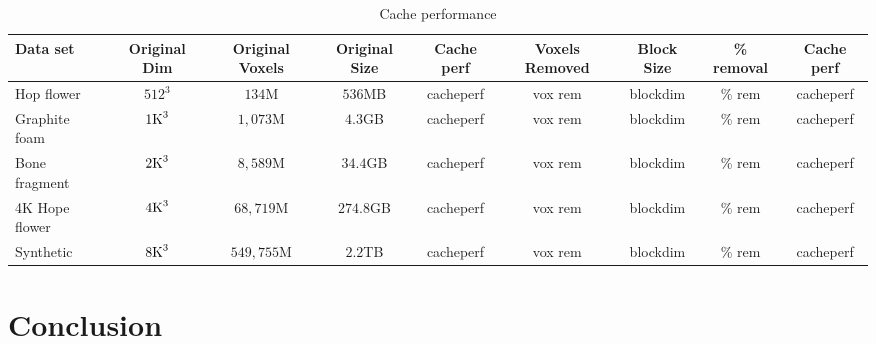 \documentclass[journal]{vgtc}                %
\begin{document}
\begin{table}[h]
	\caption{Cache performance}\label{table:cachePerformance}
	\scriptsize
	
	\begin{center}
		
		\begin{tabular}{lcccc|cccc}
			\textbf{Data set} & \textbf{Original Dim}& \textbf{Original Voxels} & \textbf{Original Size}& \textbf{Cache perf} & 
				\textbf{Voxels Removed} & \textbf{Block Size} & \textbf{\% removal} & \textbf{Cache perf}\\
			
			\hline
			
			Hop flower        & $512^3$                    &  $134$M       & $536$MB & cacheperf & vox rem & blockdim & \% rem & cacheperf \\
			Graphite foam   & $1\textnormal{K}^3$  & $1,073$M     & $4.3$GB & cacheperf & vox rem & blockdim & \% rem & cacheperf \\
			Bone fragment  & $2\textnormal{K}^3$  & $8,589$M    & $34.4$GB & cacheperf & vox rem  & blockdim & \% rem & cacheperf \\
			4K Hope flower & $4\textnormal{K}^3$  & $68,719$M   & $274.8$GB & cacheperf & vox rem & blockdim & \% rem & cacheperf \\
			Synthetic          & $8\textnormal{K}^3$  & $549,755$M & $2.2$TB & cacheperf & vox rem & blockdim & \% rem & cacheperf \\
		\end{tabular}
		
	\end{center}
	
\end{table}


\section{Conclusion}

\acknowledgments{}



\end{document}
